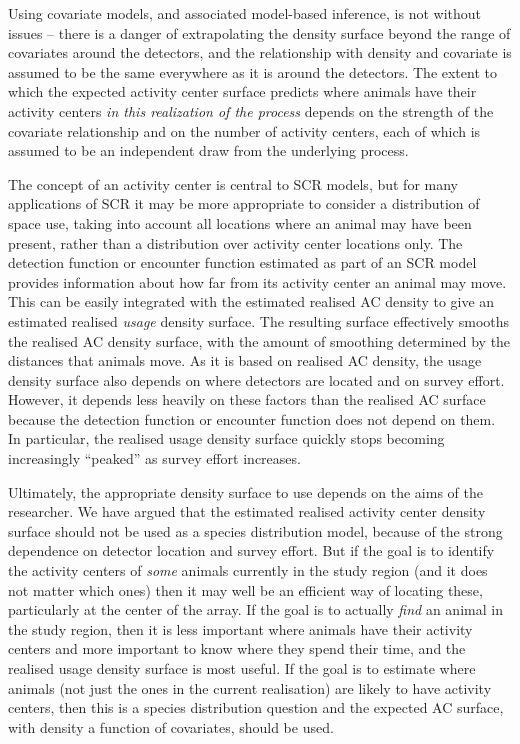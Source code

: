 \documentclass[10pt,a4paper]{article}
\begin{document}
Using covariate models, and associated model-based inference, is not without issues -- there is a danger of extrapolating the density surface beyond the range of covariates around the detectors, and the relationship with density and covariate is assumed to be the same everywhere as it is around the detectors. The extent to which the expected activity center surface predicts where animals have their activity centers {\it in this realization of the process} depends on the strength of the covariate relationship and on the number of activity centers, each of which is assumed to be an independent draw from the underlying process. %

The concept of an activity center is central to SCR models, but for many applications of SCR it may be more appropriate to consider a distribution of space use, taking into account all locations where an animal may have been present, rather than a distribution over activity center locations only. The detection function or encounter function estimated as part of an SCR model provides information about how far from its activity center an animal may move. This can be easily integrated with the estimated realised AC density to give an estimated realised {\it usage} density surface. The resulting surface effectively smooths the realised AC density surface, with the amount of smoothing determined by the distances that animals move. As it is based on realised AC density, the usage density surface also depends on where detectors are located and on survey effort. However, it depends less heavily on these factors than the realised AC surface because the detection function or encounter function does not depend on them. In particular, the realised usage density surface quickly stops becoming increasingly ``peaked'' as survey effort increases.

Ultimately, the appropriate density surface to use depends on the aims of the researcher. We have argued that the estimated realised activity center density surface should not be used as a species distribution model, because of the strong dependence on detector location and survey effort. But if the goal is to identify the activity centers of {\it some} animals currently in the study region (and it does not matter which ones) then it may well be an efficient way of locating these, particularly at the center of the array. If the goal is to actually {\it find} an animal in the study region, then it is less important where animals have their activity centers and more important to know where they spend their time, and the realised usage density surface is most useful. If the goal is to estimate where animals (not just the ones in the current realisation) are likely to have activity centers, then this is a species distribution question and the expected AC surface, with density a function of covariates, should be used.
\end{document}
